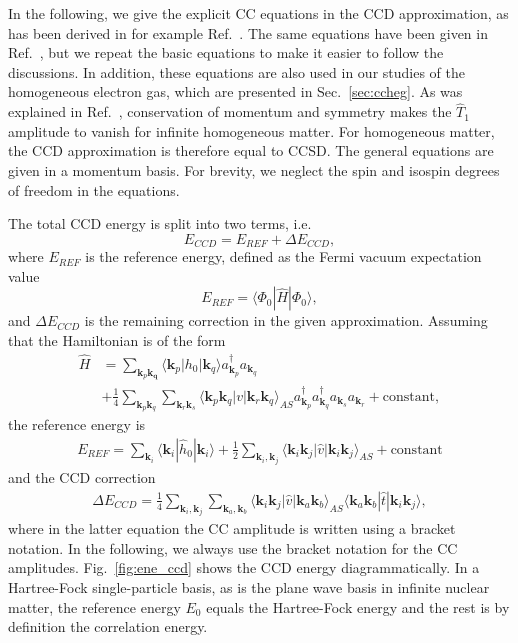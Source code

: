 \documentclass[a4paper,12pt]{report}
\begin{document}
In the following, we give the explicit CC equations in the CCD 
approximation, as has been derived in for example Ref.~\cite{crawford}. 
The same equations have been given in Ref.~\cite{baardsen}, but we 
repeat the basic equations to make it easier to follow the discussions. 
In addition, these equations are also used in our studies of the 
homogeneous electron gas, which are presented in Sec.~\ref{sec:ccheg}.  
As was explained in Ref.~\cite{baardsen}, conservation of momentum 
and symmetry makes the $\hat{T}_{1}$ amplitude to vanish for infinite 
homogeneous matter. For homogeneous matter, the CCD approximation is 
therefore equal to CCSD. The general equations are given in a 
momentum basis. For brevity, we neglect the spin and 
isospin degrees of freedom in the equations. 

The total CCD energy is split into two terms, i.e. 
\begin{equation}
  E_{CCD} = E_{REF} + \Delta E_{CCD},
\end{equation}
where $E_{REF}$ is the reference energy, defined as the Fermi
vacuum expectation value 
\begin{equation}
  E_{REF} = \langle \Phi_{0}|\hat{H}|\Phi_{0}\rangle ,
\end{equation}
and $\Delta E_{CCD}$ is the remaining correction in the given
approximation. Assuming that the Hamiltonian is of the form
\begin{align}
  \hat{H} &= \sum_{\mathbf{k}_{p}\mathbf{k_{q}}}\langle 
  \mathbf{k}_{p}|h_{0}|\mathbf{k}_{q}\rangle 
  a_{\mathbf{k}_{p}}^{\dagger }a_{\mathbf{k}_{q}} \nonumber \\
  &+ \frac{1}{4}\sum_{\mathbf{k}_{p}\mathbf{k}_{q}}
  \sum_{\mathbf{k}_{r}\mathbf{k}_{s}}\langle \mathbf{k}_{p}
  \mathbf{k}_{q}|v|\mathbf{k}_{r}\mathbf{k}_{q}\rangle_{AS}
  a_{\mathbf{k}_{p}}^{\dagger }a_{\mathbf{k}_{q}}^{\dagger }
  a_{\mathbf{k}_{s}}a_{\mathbf{k}_{r}} 
  + \text{constant},
\end{align}
the reference energy is
\begin{align}
  E_{REF} = \sum_{\mathbf{k}_{i}}\langle 
\mathbf{k}_{i}|\hat{h}_{0}|\mathbf{k}_{i}\rangle 
+ \frac{1}{2}\sum_{\mathbf{k}_{i},\mathbf{k}_{j}}
\langle \mathbf{k}_{i}\mathbf{k}_{j}|\hat{v}|
\mathbf{k}_{i}\mathbf{k}_{j}\rangle_{AS} 
+ \text{constant}
  \label{eq:ene_ref}
\end{align}
and the CCD correction  
\begin{align}
  \Delta E_{CCD} = \frac{1}{4}\sum_{\mathbf{k}_{i},\mathbf{k}_{j}}\sum_{\mathbf{k}_{a},\mathbf{k}_{b}}\langle \mathbf{k}_{i}\mathbf{k}_{j}|\hat{v}|\mathbf{k}_{a}\mathbf{k}_{b}\rangle_{AS}\langle \mathbf{k}_{a}\mathbf{k}_{b}|\hat{t}|\mathbf{k}_{i}\mathbf{k}_{j}\rangle ,
  \label{eq:ene_ccd}
\end{align}
where in the latter equation the CC amplitude is written using a bracket notation. In the following, we always use the bracket notation for the CC amplitudes. Fig.~\ref{fig:ene_ccd} shows the CCD energy diagrammatically. In a Hartree-Fock single-particle basis, as is the plane wave basis in infinite nuclear matter, the reference energy $E_{0}$ equals the Hartree-Fock energy and the rest is by definition the correlation energy.
\end{document}
